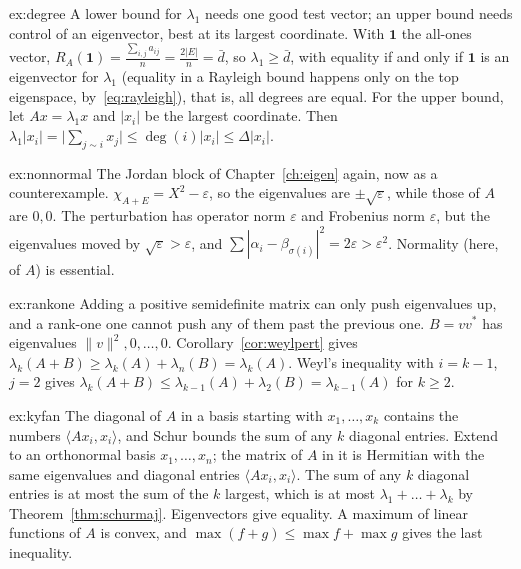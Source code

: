 \begin{solution}{ex:degree}
\idea A lower bound for $\lambda_1$ needs one good test vector; an upper bound needs control of an eigenvector, best at its
largest coordinate.
\writeup With $\mathbf 1$ the all-ones vector, $R_A(\mathbf 1)=\frac{\sum_{i,j}a_{ij}}n=\frac{2|E|}n=\bar d$, so
$\lambda_1\ge\bar d$, with equality if and only if $\mathbf 1$ is an eigenvector for $\lambda_1$ (equality in a Rayleigh
bound happens only on the top eigenspace, by~\eqref{eq:rayleigh}), that is, all degrees are equal. For the upper bound, let
$Ax=\lambda_1x$ and $|x_i|$ be the largest coordinate. Then $\lambda_1|x_i|=\bigl|\sum_{j\sim i}x_j\bigr|\le\deg(i)|x_i|\le
\Delta|x_i|$.
\end{solution}

\begin{solution}{ex:nonnormal}
\idea The Jordan block of Chapter~\ref{ch:eigen} again, now as a counterexample.
\writeup $\chi_{A+E}=X^2-\varepsilon$, so the eigenvalues are $\pm\sqrt\varepsilon$, while those of $A$ are $0,0$. The
perturbation has operator norm $\varepsilon$ and Frobenius norm $\varepsilon$, but the eigenvalues moved by $\sqrt\varepsilon>
\varepsilon$, and $\sum|\alpha_i-\beta_{\sigma(i)}|^2=2\varepsilon>\varepsilon^2$. Normality (here, of $A$) is essential.
\end{solution}

\begin{solution}{ex:rankone}
\idea Adding a positive semidefinite matrix can only push eigenvalues up, and a rank-one one cannot push any of them past
the previous one.
\writeup $B=vv^*$ has eigenvalues $\|v\|^2,0,\dots,0$. Corollary~\ref{cor:weylpert} gives $\lambda_k(A+B)\ge\lambda_k(A)+
\lambda_n(B)=\lambda_k(A)$. Weyl's inequality with $i=k-1$, $j=2$ gives $\lambda_k(A+B)\le\lambda_{k-1}(A)+\lambda_2(B)=
\lambda_{k-1}(A)$ for $k\ge2$.
\end{solution}

\begin{solution}{ex:kyfan}
\idea The diagonal of $A$ in a basis starting with $x_1,\dots,x_k$ contains the numbers $\langle Ax_i,x_i\rangle$, and Schur
bounds the sum of any $k$ diagonal entries.
\writeup Extend to an orthonormal basis $x_1,\dots,x_n$; the matrix of $A$ in it is Hermitian with the same eigenvalues and
diagonal entries $\langle Ax_i,x_i\rangle$. The sum of any $k$ diagonal entries is at most the sum of the $k$ largest, which
is at most $\lambda_1+\dots+\lambda_k$ by Theorem~\ref{thm:schurmaj}. Eigenvectors give equality. A maximum of linear
functions of $A$ is convex, and $\max(f+g)\le\max f+\max g$ gives the last inequality.
\end{solution}


